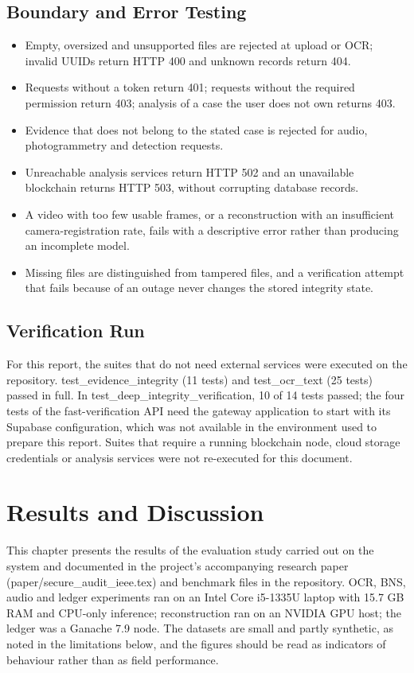 \documentclass[12pt,a4paper,oneside]{report}
\newcommand{\code}[1]{{\small\ttfamily #1}}
\begin{document}
\section{Boundary and Error Testing}
\begin{itemize}
  \item Empty, oversized and unsupported files are rejected at upload or OCR; invalid UUIDs return HTTP 400 and unknown records return 404.
  \item Requests without a token return 401; requests without the required permission return 403; analysis of a case the user does not own returns 403.
  \item Evidence that does not belong to the stated case is rejected for audio, photogrammetry and detection requests.
  \item Unreachable analysis services return HTTP 502 and an unavailable blockchain returns HTTP 503, without corrupting database records.
  \item A video with too few usable frames, or a reconstruction with an insufficient camera-registration rate, fails with a descriptive error rather than producing an incomplete model.
  \item Missing files are distinguished from tampered files, and a verification attempt that fails because of an outage never changes the stored integrity state.
\end{itemize}

\section{Verification Run}
For this report, the suites that do not need external services were executed on the repository. \code{test\_\allowbreak{}evidence\_\allowbreak{}integrity} (11 tests) and \code{test\_\allowbreak{}ocr\_\allowbreak{}text} (25 tests) passed in full. In \code{test\_\allowbreak{}deep\_\allowbreak{}integrity\_\allowbreak{}verification}, 10 of 14 tests passed; the four tests of the fast-verification API need the gateway application to start with its Supabase configuration, which was not available in the environment used to prepare this report. Suites that require a running blockchain node, cloud storage credentials or analysis services were not re-executed for this document.

\chapter{Results and Discussion}
This chapter presents the results of the evaluation study carried out on the system and documented in the project's accompanying research paper (\code{paper/\allowbreak{}secure\_\allowbreak{}audit\_\allowbreak{}ieee.tex}) and benchmark files in the repository. OCR, BNS, audio and ledger experiments ran on an Intel Core i5-1335U laptop with 15.7 GB RAM and CPU-only inference; reconstruction ran on an NVIDIA GPU host; the ledger was a Ganache 7.9 node. The datasets are small and partly synthetic, as noted in the limitations below, and the figures should be read as indicators of behaviour rather than as field performance.
\end{document}
